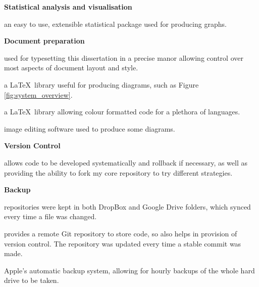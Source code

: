 \documentclass[12pt,twoside,notitlepage]{report}
\begin{document}
        \noindent\textbf{Statistical analysis and visualisation}
            \begin{description}[font=\normalfont\itshape, labelindent=10pt]
                \item[Matlab:] an easy to use, extensible statistical package used for producing graphs.
            \end{description}

        \noindent\textbf{Document preparation}
            \begin{description}[font=\normalfont\itshape, labelindent=10pt]
                \item[\LaTeX:] used for typesetting this dissertation in a precise manor allowing control over most 
                    aspects of document layout and style.
                \item[Tikz:] a \LaTeX\ library useful for producing diagrams, such as Figure \ref{fig:system_overview}.
                \item[Listings:] a \LaTeX\ library allowing colour formatted code for a plethora of languages.
                \item[Adobe Photoshop:] image editing software used to produce some diagrams.
            \end{description}

        \noindent\textbf{Version Control}
            \begin{description}[font=\normalfont\itshape, labelindent=10pt]
                \item[Git:] allows code to be developed systematically and rollback if necessary, as well as providing  
                    the ability to fork my core repository to try different strategies.
            \end{description}

        \noindent\textbf{Backup}
            \begin{description}[font=\normalfont\itshape, labelindent=10pt]
                \item[DropBox and Google Drive:] repositories were kept in both DropBox and Google Drive folders, which 
                    synced every time a file was changed.
                \item[Github:] provides a remote Git repository to store code, so also helps in provision of version 
                    control. The repository was updated every time a stable commit was made.
                \item[Time machine:] Apple's automatic backup system, allowing for hourly backups of the whole hard drive 
                    to be taken.
            \end{description}
\end{document}

